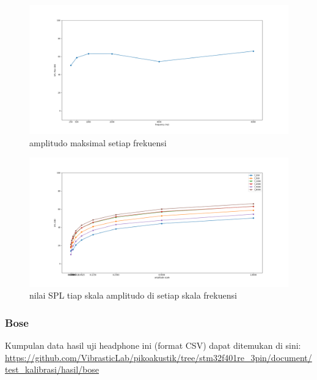 \documentclass[12pt,]{article}
\begin{document}
	\newpage
	\begin{figure}[!ht]
		\centering
		\includegraphics[width=500pt]{hasil/senheiser/maxallfreq/max_freq}
		\caption{amplitudo maksimal setiap frekuensi}
	\end{figure}
	
	\begin{figure}[!ht]
		\centering
		\includegraphics[width=500pt]{hasil/senheiser/maxallfreq/each_freq}
		\caption{nilai SPL tiap skala amplitudo di setiap skala frekuensi}
	\end{figure}
	
	\subsubsection{Bose}
	
	Kumpulan data hasil uji headphone ini (format CSV) dapat ditemukan di sini:\\
	\url{https://github.com/VibrasticLab/pikoakustik/tree/stm32f401re_3pin/document/test_kalibrasi/hasil/bose}
	
\end{document}
